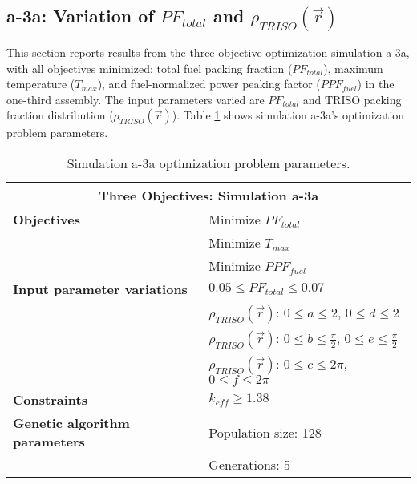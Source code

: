 \subsection{a-3a: Variation of $PF_{total}$ and $\rho_{TRISO}(\vec{r})$}
\label{sec:a-3a}
This section reports results from the three-objective optimization simulation a-3a, 
with all objectives minimized: total fuel packing fraction ($PF_{total}$), 
maximum temperature ($T_{max}$), and fuel-normalized power peaking factor ($PPF_{fuel}$)
in the one-third assembly.  
The input parameters varied are $PF_{total}$ and TRISO packing fraction distribution 
($\rho_{TRISO}(\vec{r})$). 
Table \ref{tab:simulationa3a} shows simulation a-3a's optimization problem parameters. 
\begin{table}[htbp!]
    \centering
    \onehalfspacing
    \caption{Simulation a-3a optimization problem parameters.}
	\label{tab:simulationa3a}
    \footnotesize
    \begin{tabular}{l|p{5.3cm}}
    \hline 
    \multicolumn{2}{c}{\textbf{Three Objectives: Simulation a-3a}} \\
    \hline 
    \textbf{Objectives} & Minimize $PF_{total}$ \\
    & Minimize $T_{max}$ \\
    & Minimize $PPF_{fuel}$ \\
    \hline 
    \textbf{Input parameter variations} & $0.05 \leq PF_{total} \leq 0.07$ \\
    & $\rho_{TRISO}(\vec{r})$: $0 \leq a \leq 2$, $0 \leq d \leq 2$\\
    & $\rho_{TRISO}(\vec{r})$: $0 \leq b \leq \frac{\pi}{2}$, $0 \leq e \leq \frac{\pi}{2}$\\
    & $\rho_{TRISO}(\vec{r})$: $0 \leq c \leq 2\pi$, $0 \leq f \leq 2\pi$\\
    \hline
    \textbf{Constraints} & $k_{eff} \geq 1.38$\\ 
    \hline 
    \textbf{Genetic algorithm parameters} & Population size: 128 \\
    & Generations: 5 \\
    \hline
    \end{tabular}
\end{table}

